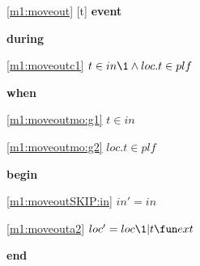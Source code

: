 \noindent \ref{m1:moveout} [t] \textbf{event}
\begin{block}
\item \textbf{during}
\begin{block}
\item[ \eqref{m1:moveoutc1} ]$t \in in  %
		\1\land loc.t \in plf $ %
\end{block}
\item \textbf{when}
\begin{block}
\item[ \eqref{m1:moveoutmo:g1} ]$t \in in $ %
\item[ \eqref{m1:moveoutmo:g2} ]$loc.t \in plf $ %
\end{block}
\item \textbf{begin}
\begin{block}
\item[ \eqref{m1:moveoutSKIP:in} ]$in' = in$ %
\item[ \eqref{m1:moveouta2} ]$loc' = loc \1 | t \fun ext $ %
\end{block}
\item \textbf{end} \\
\end{block}
